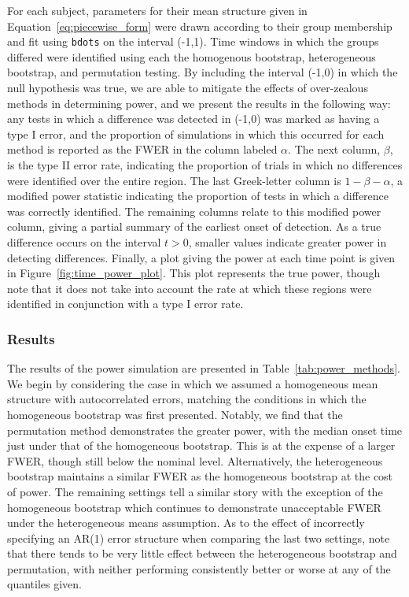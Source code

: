 \documentclass{article}
\newcommand{\xt}{\texttt}
\begin{document}
For each subject, parameters for their mean structure given in Equation~\ref{eq:piecewise_form} were drawn according to their group membership and fit using \xt{bdots} on the interval (-1,1). Time windows in which the groups differed were identified using each the homogenous bootstrap, heterogeneous bootstrap, and permutation testing. By including the interval (-1,0) in which the null hypothesis was true, we are able to mitigate the effects of over-zealous methods in determining power, and we present the results in the following way: any tests in which a difference was detected in (-1,0) was marked as having a type I error, and the proportion of simulations in which this occurred for each method is reported as the FWER in the column labeled $\alpha$. The next column, $\beta$, is the type II error rate, indicating the proportion of trials in which no differences were identified over the entire region. The last Greek-letter column is $1 - \beta - \alpha$, a modified power statistic indicating the proportion of tests in which a difference was correctly identified. The remaining columns relate to this modified power column, giving a partial summary of the earliest onset of detection. As a true difference occurs on the interval $t > 0$, smaller values indicate greater power in detecting differences. Finally, a plot giving the power at each time point is given in Figure~\ref{fig:time_power_plot}. This plot represents the true power, though note that it does not take into account the rate at which these regions were identified in conjunction with a type I error rate. 


\subsubsection{Results}


The results of the power simulation are presented in Table~\ref{tab:power_methods}. We begin by considering the case in which we assumed a homogeneous mean structure with autocorrelated errors, matching the conditions in which the homogeneous bootstrap was first presented. Notably, we find that the permutation method demonstrates the greater power, with the median onset time just under that of the homogeneous bootstrap. This is at the expense of a larger FWER, though still below the nominal level. Alternatively, the heterogeneous bootstrap maintains a similar FWER as the homogeneous bootstrap at the cost of power. The remaining settings tell a similar story with the exception of the homogeneous bootstrap which continues to demonstrate unacceptable FWER under the heterogeneous means assumption. As to the effect of incorrectly specifying an AR(1) error structure when comparing the last two settings, note that there tends to be very little effect between the heterogeneous bootstrap and permutation, with neither performing consistently better or worse at any of the quantiles given.
\end{document}
